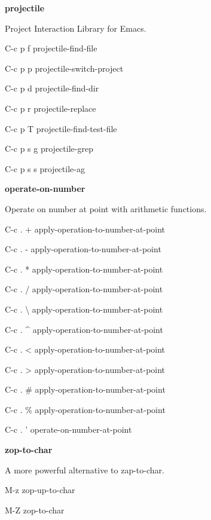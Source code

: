 \documentclass[10pt]{article}
\renewcommand\subsection[1]{\smallskip\par\textbf{\color{heading}#1}}
\newcommand\humanreadable[1]{{\par\color{default}\small\sffamily#1}}
\renewcommand\subsection[1]{\smallskip\par\textbf{\color{heading}#1}}
\newcommand\humanreadable[1]{{\par\color{orange}\small\sffamily#1}}
\begin{document}
\begin{multicols}{4}
  \subsection{projectile}
  \humanreadable{Project Interaction Library for Emacs.}
  \begin{keylist}
  \item[C-c p f] projectile-find-file
  \item[C-c p p] projectile-switch-project
  \item[C-c p d] projectile-find-dir
  \item[C-c p r] projectile-replace
  \item[C-c p T] projectile-find-test-file
  \item[C-c p s g] projectile-grep
  \item[C-c p s s] projectile-ag
  \end{keylist}

  \subsection{operate-on-number}
  \humanreadable{Operate on number at point with arithmetic functions.}
  \begin{keylist}
  \item[C-c . +] apply-operation-to-number-at-point
  \item[C-c . -] apply-operation-to-number-at-point
  \item[C-c . *] apply-operation-to-number-at-point
  \item[C-c . /] apply-operation-to-number-at-point
  \item[C-c . \textbackslash] apply-operation-to-number-at-point
  \item[C-c . \textasciicircum] apply-operation-to-number-at-point
  \item[C-c . <] apply-operation-to-number-at-point
  \item[C-c . >] apply-operation-to-number-at-point
  \item[C-c . \#] apply-operation-to-number-at-point
  \item[C-c . \%] apply-operation-to-number-at-point
  \item[C-c . '] operate-on-number-at-point
  \end{keylist}

  \subsection{zop-to-char}
  \humanreadable{A more powerful alternative to zap-to-char.}
  \begin{keylist}
  \item[M-z] zop-up-to-char
  \item[M-Z] zop-to-char
  \end{keylist}


\end{multicols}
\end{document}
